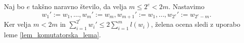 


\begin{dokaz}
    Naj bo $e$ takšno naravno število, da velja $m \le 2^{e} < 2m$. Nastavimo \begin{equation*}
    w_1' := w_1, \ldots, w_{m}' := w_{m}, w_{m+1}' := w_1, \ldots, w_{2^{e}}' := w_{2^{e} - m}. 
    \end{equation*}
    Ker velja $m < 2m$ in $\sum_{i = 1}^{2^{e}} w_i' \le 2 \sum_{i = 1}^{m} l(w_i)$, želena ocena sledi z uporabo leme \ref{lem_komutatorska_lema}.  
\end{dokaz}


